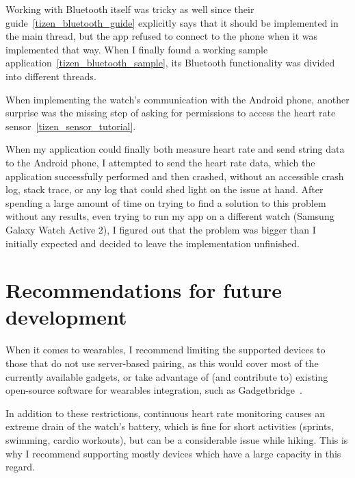 Working with Bluetooth itself was tricky as well since their guide~\ref{tizen_bluetooth_guide} explicitly says that it should be implemented in the main thread,
but the app refused to connect to the phone when it was implemented that way.
When I finally found a working sample application~\ref{tizen_bluetooth_sample}, its Bluetooth functionality was divided into different threads.

When implementing the watch's communication with the Android phone, another surprise was the missing step of asking for permissions to access the heart rate sensor~\ref{tizen_sensor_tutorial}.

When my application could finally both measure heart rate and send string data to the Android phone, I attempted to send the heart rate data,
which the application successfully performed and then crashed, without an accessible crash log, stack trace, or any log that could shed light on the issue at hand.
After spending a large amount of time on trying to find a solution to this problem without any results, even trying to run my app on a different watch (Samsung Galaxy Watch Active 2), I figured out that the problem was bigger than I initially expected and decided to leave the implementation unfinished.

\section{Recommendations for future development}
When it comes to wearables, I recommend limiting the supported devices to those that do not use server-based pairing, as this would cover most of the currently available gadgets,
or take advantage of (and contribute to) existing open-source software for wearables integration, such as Gadgetbridge~\cite{Gadgetbridge}.

In addition to these restrictions, continuous heart rate monitoring causes an extreme drain of the watch's battery,
which is fine for short activities (sprints, swimming, cardio workouts), but can be a considerable issue while hiking.
This is why I recommend supporting mostly devices which have a large capacity in this regard.
